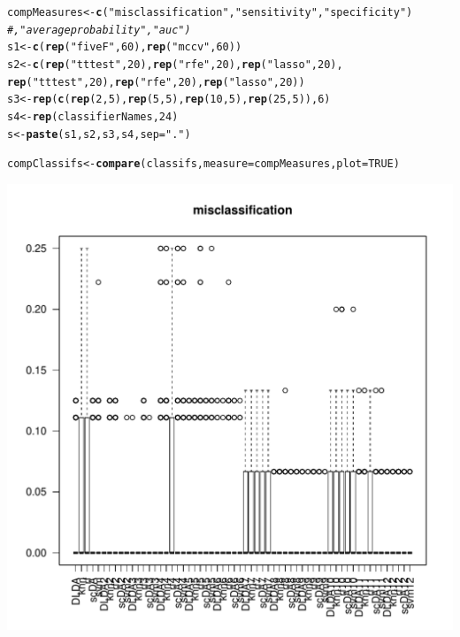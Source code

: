 \documentclass{article}\usepackage[]{graphicx}\usepackage[]{color}
\makeatletter
\def\maxwidth{ %
  \ifdim\Gin@nat@width>\linewidth
    \linewidth
  \else
    \Gin@nat@width
  \fi
}
\newcommand{\hlnum}[1]{\textcolor[rgb]{0.686,0.059,0.569}{#1}}%
\newcommand{\hlstr}[1]{\textcolor[rgb]{0.192,0.494,0.8}{#1}}%
\newcommand{\hlcom}[1]{\textcolor[rgb]{0.678,0.584,0.686}{\textit{#1}}}%
\newcommand{\hlstd}[1]{\textcolor[rgb]{0.345,0.345,0.345}{#1}}%
\newcommand{\hlkwb}[1]{\textcolor[rgb]{0.69,0.353,0.396}{#1}}%
\newcommand{\hlkwc}[1]{\textcolor[rgb]{0.333,0.667,0.333}{#1}}%
\newcommand{\hlkwd}[1]{\textcolor[rgb]{0.737,0.353,0.396}{\textbf{#1}}}%
\newenvironment{kframe}{%
 \def\at@end@of@kframe{}%
 \ifinner\ifhmode%
  \def\at@end@of@kframe{\end{minipage}}%
  \begin{minipage}{\columnwidth}%
 \fi\fi%
 \def\FrameCommand##1{\hskip\@totalleftmargin \hskip-\fboxsep
 \colorbox{shadecolor}{##1}\hskip-\fboxsep
     \hskip-\linewidth \hskip-\@totalleftmargin \hskip\columnwidth}%
 \MakeFramed {\advance\hsize-\width
   \@totalleftmargin\z@ \linewidth\hsize
   \@setminipage}}%
 {\par\unskip\endMakeFramed%
 \at@end@of@kframe}
\newenvironment{knitrout}{}{} %
\makeatother
\begin{document}
\begin{knitrout}
\color{fgcolor}\begin{kframe}
\begin{alltt}
\hlstd{compMeasures} \hlkwb{<-}  \hlkwd{c}\hlstd{(}\hlstr{"misclassification"}\hlstd{,} \hlstr{"sensitivity"}\hlstd{,} \hlstr{"specificity"}\hlstd{)}
                  \hlcom{# , "average probability", "auc")}
\hlstd{s1} \hlkwb{<-} \hlkwd{c}\hlstd{(}\hlkwd{rep}\hlstd{(}\hlstr{"fiveF"}\hlstd{,} \hlnum{60}\hlstd{),} \hlkwd{rep}\hlstd{(}\hlstr{"mccv"}\hlstd{,} \hlnum{60}\hlstd{))}
\hlstd{s2}\hlkwb{<-} \hlkwd{c}\hlstd{(}\hlkwd{rep}\hlstd{(}\hlstr{"tttest"}\hlstd{,}\hlnum{20}\hlstd{),} \hlkwd{rep} \hlstd{(}\hlstr{"rfe"}\hlstd{,}\hlnum{20}\hlstd{) ,}\hlkwd{rep}\hlstd{(}\hlstr{"lasso"}\hlstd{,}\hlnum{20}\hlstd{),}
       \hlkwd{rep}\hlstd{(}\hlstr{"tttest"}\hlstd{,}\hlnum{20}\hlstd{),} \hlkwd{rep}\hlstd{(}\hlstr{"rfe"}\hlstd{,}\hlnum{20}\hlstd{),} \hlkwd{rep}\hlstd{(}\hlstr{"lasso"}\hlstd{,}\hlnum{20}\hlstd{))}
\hlstd{s3} \hlkwb{<-} \hlkwd{rep}\hlstd{(}\hlkwd{c}\hlstd{(}\hlkwd{rep}\hlstd{(}\hlnum{2}\hlstd{,}\hlnum{5}\hlstd{),} \hlkwd{rep}\hlstd{(}\hlnum{5}\hlstd{,}\hlnum{5}\hlstd{),}\hlkwd{rep}\hlstd{(}\hlnum{10}\hlstd{,}\hlnum{5}\hlstd{),} \hlkwd{rep}\hlstd{(}\hlnum{25}\hlstd{,}\hlnum{5}\hlstd{)),}\hlnum{6}\hlstd{)}
\hlstd{s4} \hlkwb{<-} \hlkwd{rep}\hlstd{(classifierNames,} \hlnum{24}\hlstd{)}
\hlstd{s} \hlkwb{<-} \hlkwd{paste}\hlstd{(s1,s2,s3,s4,} \hlkwc{sep}\hlstd{=}\hlstr{"."}\hlstd{)}

\hlstd{compClassifs} \hlkwb{<-} \hlkwd{compare}\hlstd{(classifs,}  \hlkwc{measure} \hlstd{= compMeasures,} \hlkwc{plot}\hlstd{=}\hlnum{TRUE}\hlstd{)}
\end{alltt}
\end{kframe}
\includegraphics[width=\maxwidth]{images/graficclassify1Eval-1} 


\end{knitrout}
\end{document}
